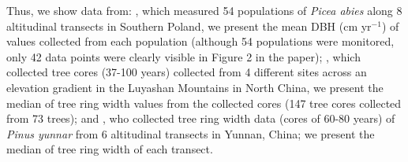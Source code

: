 \documentclass[11pt]{article}
\begin{document}
Thus, we show data from: \citet{oleksyn1998growth}, which measured 54 populations of  \emph{Picea abies} along 8 altitudinal transects in Southern Poland, we present the mean DBH (cm yr$^{-1}$) of values collected from each population (although 54 populations were monitored, only 42 data points were clearly visible in Figure 2 in the paper); \citet{wang2017climatic}, which collected  tree cores (37-100 years) collected from 4 different sites across an elevation gradient in the Luyashan Mountains in North China, we present the median of tree ring width values from the collected cores (147 tree cores collected from 73 trees); and \citet{zhou2022altitudinal}, who collected tree ring width data (cores of 60-80 years) of \emph{Pinus yunnar} from 6 altitudinal transects in Yunnan, China; we present the median of tree ring width of each transect.




\end{document}
